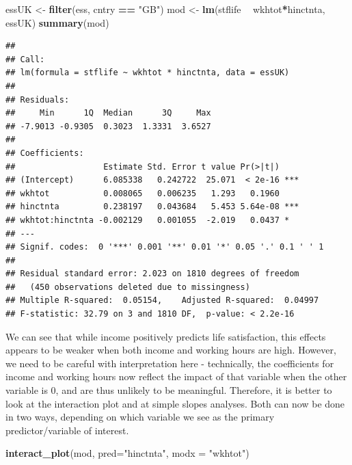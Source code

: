 \documentclass[
]{book}
\newenvironment{Shaded}{\begin{snugshade}}{\end{snugshade}}
\newcommand{\DataTypeTok}[1]{\textcolor[rgb]{0.13,0.29,0.53}{#1}}
\newcommand{\KeywordTok}[1]{\textcolor[rgb]{0.13,0.29,0.53}{\textbf{#1}}}
\newcommand{\NormalTok}[1]{#1}
\newcommand{\OperatorTok}[1]{\textcolor[rgb]{0.81,0.36,0.00}{\textbf{#1}}}
\newcommand{\StringTok}[1]{\textcolor[rgb]{0.31,0.60,0.02}{#1}}
\begin{document}
\begin{Shaded}
\begin{Highlighting}[]
\NormalTok{essUK <-}\StringTok{ }\KeywordTok{filter}\NormalTok{(ess, cntry }\OperatorTok{==}\StringTok{ "GB"}\NormalTok{)}
\NormalTok{mod <-}\StringTok{ }\KeywordTok{lm}\NormalTok{(stflife }\OperatorTok{~}\StringTok{ }\NormalTok{wkhtot}\OperatorTok{*}\NormalTok{hinctnta, essUK) }
\KeywordTok{summary}\NormalTok{(mod)}
\end{Highlighting}
\end{Shaded}

\begin{verbatim}
## 
## Call:
## lm(formula = stflife ~ wkhtot * hinctnta, data = essUK)
## 
## Residuals:
##     Min      1Q  Median      3Q     Max 
## -7.9013 -0.9305  0.3023  1.3331  3.6527 
## 
## Coefficients:
##                  Estimate Std. Error t value Pr(>|t|)    
## (Intercept)      6.085338   0.242722  25.071  < 2e-16 ***
## wkhtot           0.008065   0.006235   1.293   0.1960    
## hinctnta         0.238197   0.043684   5.453 5.64e-08 ***
## wkhtot:hinctnta -0.002129   0.001055  -2.019   0.0437 *  
## ---
## Signif. codes:  0 '***' 0.001 '**' 0.01 '*' 0.05 '.' 0.1 ' ' 1
## 
## Residual standard error: 2.023 on 1810 degrees of freedom
##   (450 observations deleted due to missingness)
## Multiple R-squared:  0.05154,	Adjusted R-squared:  0.04997 
## F-statistic: 32.79 on 3 and 1810 DF,  p-value: < 2.2e-16
\end{verbatim}

We can see that while income positively predicts life satisfaction, this effects appears to be weaker when both income and working hours are high. However, we need to be careful with interpretation here - technically, the coefficients for income and working hours now reflect the impact of that variable when the other variable is 0, and are thus unlikely to be meaningful. Therefore, it is better to look at the interaction plot and at simple slopes analyses. Both can now be done in two ways, depending on which variable we see as the primary predictor/variable of interest.

\begin{Shaded}
\begin{Highlighting}[]
\KeywordTok{interact_plot}\NormalTok{(mod, }\DataTypeTok{pred=}\StringTok{"hinctnta"}\NormalTok{, }\DataTypeTok{modx =} \StringTok{"wkhtot"}\NormalTok{)}
\end{Highlighting}
\end{Shaded}
\end{document}
